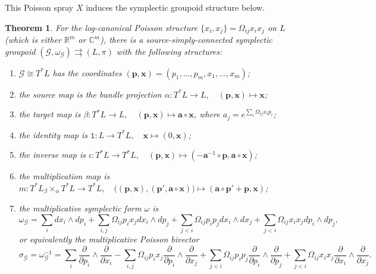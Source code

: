 \documentclass{amsart}
\newtheorem{theorem}{Theorem}[section]
\numberwithin{equation}{section}
\newcommand{\bfa}{{\boldsymbol{a}}}
\newcommand{\bfp}{{\boldsymbol{p}}}
\newcommand{\bfx}{{\boldsymbol{x}}}
\newcommand{\cG}{\mathcal{G}}
\newcommand{\CC}{\mathbb{C}}
\newcommand{\RR}{\mathbb{R}}
\newcommand{\rra}{\rightrightarrows}
\begin{document}
This Poisson spray $X$ induces the symplectic groupoid structure below.
\begin{theorem} 
  \label{thm:PoiSpLogC}
  For the log-canonical Poisson structure $\{x_i, x_j\} = \Omega_{ij} x_i x_j$ on $L$ (which is either $\RR^m$ or $\CC^m$), there is a source-simply-connected symplectic groupoid $(\cG, \omega_\cG) \rra (L, \pi)$ with the following structures:
  \begin{enumerate}
    \item $\cG \cong T^*L$ has the coordinates $(\bfp, \bfx) = (p_1, \ldots, p_m, x_1, \ldots, x_m)$;
    \item the source map is the bundle projection $\alpha: T^*L \to L, \quad (\bfp, \bfx) \mapsto \bfx$;
    \item the target map is $\beta: T^*L \to L, \quad (\bfp, \bfx) \mapsto \bfa \circ \bfx$, where $a_j = e^{\sum_i \Omega_{ij} x_ip_i}$;
    \item the identity map is $\mathtt{1}: L \to T^*L, \quad \bfx \mapsto (0, \bfx)$;
    \item the inverse map is $\iota: T^*L \to T^*L, \quad (\bfp, \bfx) \mapsto (-\bfa^{-1} \circ \bfp,\bfa \circ \bfx)$;
    \item the multiplication map is $m: T^*L {_\beta \times_\alpha} T^*L \to T^*L, \quad \big((\bfp, \bfx), (\bfp', \bfa \circ \bfx)\big) \mapsto (\bfa \circ \bfp' + \bfp, \bfx )$;
    \item the multiplicative symplectic form $\omega$ is
      \begin{equation}
	\omega_\cG = \sum_{i} dx_i \wedge dp_i + \sum_{i, j} \Omega_{ij}p_ix_j dx_i \wedge dp_j + \sum_{j < i} \Omega_{ij}p_ip_j dx_i \wedge dx_j + \sum_{j < i} \Omega_{ij}x_ix_j dp_i \wedge dp_j, 
      \end{equation}
      or equivalently the multiplicative Poisson bivector
      \begin{equation}
        \label{eq:2-formGA}
      	\sigma_\cG = \omega_\cG^{-1} = \sum_{i} \frac{\partial}{\partial p_i} \wedge \frac{\partial}{\partial x_i} - \sum_{i, j} \Omega_{ij}p_i x_j \frac{\partial}{\partial p_i} \wedge \frac{\partial}{\partial x_j} +\sum_{j < i} \Omega_{ij}p_ip_j \frac{\partial}{\partial p_i} \wedge \frac{\partial}{\partial p_j} +\sum_{j < i} \Omega_{ij}x_ix_j \frac{\partial}{\partial x_i} \wedge \frac{\partial}{\partial x_j}.
      \end{equation}
  \end{enumerate}
\end{theorem}
\end{document}
